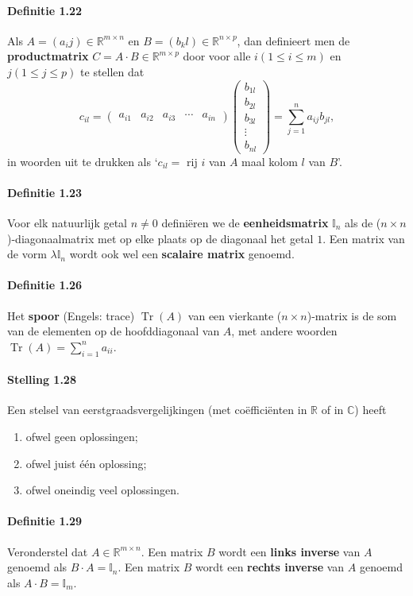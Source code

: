 \documentclass[11pt,oneside,a4paper]{article}
\DeclareMathOperator{\Tr}{Tr}
\begin{document}
	\paragraph{Definitie 1.22}
		Als $A = (a_ij) \in \mathbb{R}^{m\times n}$ en $B = (b_kl) \in \mathbb{R}^{n\times p}$, dan definieert men de \textbf{productmatrix} $C = A\cdot B \in \mathbb{R}^{m\times p}$ door voor alle $i (1\le i \le m)$ en $j (1\le j \le p)$ te stellen dat 
		$$c_{il} = \begin{pmatrix} a_{i1} & a_{i2} & a_{i3} & \cdots & a_{in} \end{pmatrix} \begin{pmatrix} b_{1l} \\ b_{2l} \\ b_{3l} \\ \vdots \\ b_{nl}		\end{pmatrix} = \sum\limits_{j=1}^n a_{ij} b_{jl},$$
		in woorden uit te drukken als `$c_{il} =$ rij $i$ van $A$ maal kolom $l$ van $B$'.
	\paragraph{Definitie 1.23}
		Voor elk natuurlijk getal $n \ne 0$ definiëren we de \textbf{eenheidsmatrix} $\mathbb{I}_n$ als de ($n \times n$)-diagonaalmatrix met op elke plaats op de diagonaal het getal $1$. Een matrix van de vorm $\lambda \mathbb{I}_n$ wordt ook wel een \textbf{scalaire matrix} genoemd.
	\paragraph{Definitie 1.26}
		Het \textbf{spoor} (Engels: trace) $\Tr(A)$ van een vierkante ($n \times n$)-matrix is de som van de elementen op de hoofddiagonaal van $A$, met andere woorden $\Tr(A)=\sum_{i=1}^{n} a_{ii}$.
	\paragraph{Stelling 1.28}
		Een stelsel van eerstgraadsvergelijkingen (met coëfficiënten in $\mathbb{R}$ of in $\mathbb{C}$) heeft
		\begin{enumerate}
			\item ofwel geen oplossingen;
			\item ofwel juist één oplossing;
			\item ofwel oneindig veel oplossingen.
		\end{enumerate}
	\paragraph{Definitie 1.29}
		Veronderstel dat $A \in \mathbb{R}^{m \times n}$. Een matrix $B$ wordt een \textbf{links inverse} van $A$ genoemd als $B\cdot A = \mathbb{I}_n$. Een matrix $B$ wordt een \textbf{rechts inverse} van $A$ genoemd als $A\cdot B = \mathbb{I}_m$.
\end{document}
